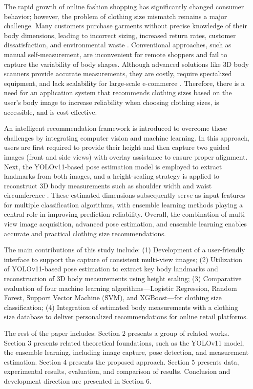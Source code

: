 \documentclass{llncs}
\begin{document}
The rapid growth of online fashion shopping has significantly changed consumer behavior; however, the problem of clothing size mismatch remains a major challenge. 
Many customers purchase garments without precise knowledge of their body dimensions, leading to incorrect sizing, increased return rates, customer dissatisfaction, and environmental waste \cite{ref8}. 
Conventional approaches, such as manual self-measurement, are inconvenient for remote shoppers and fail to capture the variability of body shapes. 
Although advanced solutions like 3D body scanners provide accurate measurements, they are costly, require specialized equipment, and lack scalability for large-scale e-commerce \cite{ref2}. 
Therefore, there is a need for an application system that recommends clothing sizes based on the user's body image to increase reliability when choosing clothing sizes, is accessible, and is cost-effective.

An intelligent recommendation framework is introduced to overcome these challenges by integrating computer vision and machine learning. In this approach, users are first required to provide their height and then capture two guided images (front and side views) with overlay assistance to ensure proper alignment. Next, the YOLOv11-based pose estimation model is employed to extract landmarks from both images, and a height-scaling strategy is applied to reconstruct 3D body measurements such as shoulder width and waist circumference \cite{ref2}. These estimated dimensions subsequently serve as input features for multiple classification algorithms, with ensemble learning methods playing a central role in improving prediction reliability. Overall, the combination of multi-view image acquisition, advanced pose estimation, and ensemble learning enables accurate and practical clothing size recommendations.

The main contributions of this study include: (1) Development of a user-friendly interface to support the capture of consistent multi-view images; (2) Utilization of YOLOv11-based pose estimation to extract key body landmarks and reconstruction of 3D body measurements using height scaling; (3) Comparative evaluation of four machine learning algorithms—Logistic Regression, Random Forest, Support Vector Machine (SVM), and XGBoost—for clothing size classification; (4) Integration of estimated body measurements with a clothing size database to deliver personalized recommendations for online retail platforms.

The rest of the paper includes: Section 2 presents a group of related works. Section 3 presents related theoretical foundations, such as the YOLOv11 model, the ensemble learning, including image capture, pose detection, and measurement estimation. Section 4 presents the proposed approach. Section 5 presents data, experimental results, evaluation, and comparison of results. Conclusion and development direction are presented in Section 6.
\end{document}
